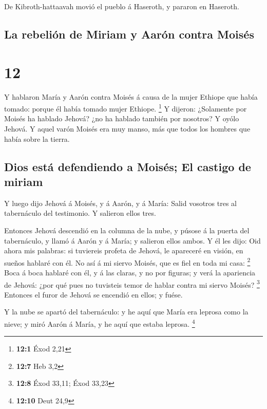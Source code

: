  De Kibroth-hattaavah movió el pueblo á Haseroth, y
pararon en Haseroth.

\hypertarget{la-rebeliuxf3n-de-miriam-y-aaruxf3n-contra-moisuxe9s}{%
\subsection{La rebelión de Miriam y Aarón contra
Moisés}\label{la-rebeliuxf3n-de-miriam-y-aaruxf3n-contra-moisuxe9s}}

\hypertarget{section-11}{%
\section{12}\label{section-11}}

 Y hablaron María y Aarón contra Moisés á causa de la
mujer Ethiope que había tomado: porque él había tomado mujer Ethiope.
\footnote{\textbf{12:1} Éxod 2,21}  Y dijeron: ¿Solamente
por Moisés ha hablado Jehová? ¿no ha hablado también por nosotros? Y
oyólo Jehová.  Y aquel varón Moisés era muy manso, más que
todos los hombres que había sobre la tierra.

\hypertarget{dios-estuxe1-defendiendo-a-moisuxe9s-el-castigo-de-miriam}{%
\subsection{Dios está defendiendo a Moisés; El castigo de
miriam}\label{dios-estuxe1-defendiendo-a-moisuxe9s-el-castigo-de-miriam}}

 Y luego dijo Jehová á Moisés, y á Aarón, y á María: Salid
vosotros tres al tabernáculo del testimonio. Y salieron ellos tres.

 Entonces Jehová descendió en la columna de la nube, y
púsose á la puerta del tabernáculo, y llamó á Aarón y á María; y
salieron ellos ambos.  Y él les dijo: Oid ahora mis
palabras: si tuviereis profeta de Jehová, le apareceré en visión, en
sueños hablaré con él.  No así á mi siervo Moisés, que es
fiel en toda mi casa: \footnote{\textbf{12:7} Heb 3,2} 
Boca á boca hablaré con él, y á las claras, y no por figuras; y verá la
apariencia de Jehová: ¿por qué pues no tuvisteis temor de hablar contra
mi siervo Moisés? \footnote{\textbf{12:8} Éxod 33,11; Éxod 33,23}
 Entonces el furor de Jehová se encendió en ellos; y
fuése.

 Y la nube se apartó del tabernáculo: y he aquí que María
era leprosa como la nieve; y miró Aarón á María, y he aquí que estaba
leprosa. \footnote{\textbf{12:10} Deut 24,9}

